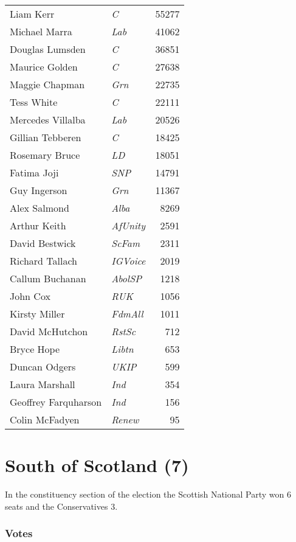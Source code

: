 {\footnotesize
\begin{tabular*}{\columnwidth}{@{\extracolsep{\fill}} p{} >{\itshape}l r @{\extracolsep{\fill}}}
	Liam Kerr & C & 55277\\%
	Michael Marra & Lab & 41062\\%
	Douglas Lumsden & C & 36851\\%
	Maurice Golden & C & 27638\\%
	Maggie Chapman & Grn & 22735\\%
	Tess White & C & 22111\\%
	Mercedes Villalba & Lab & 20526\\%
	\hline
	Gillian Tebberen & C & 18425\\
	Rosemary Bruce & LD & 18051\\
	Fatima Joji & SNP & 14791\\
	Guy Ingerson & Grn & 11367\\
	Alex Salmond & Alba & 8269\\
	Arthur Keith & AfUnity & 2591\\
	David Bestwick & ScFam & 2311\\
	Richard Tallach & IGVoice & 2019\\
	Callum Buchanan & AbolSP & 1218\\
	John Cox & RUK & 1056\\
	Kirsty Miller & FdmAll & 1011\\
	David McHutchon & RstSc & 712\\
	Bryce Hope & Libtn & 653\\
	Duncan Odgers & UKIP & 599\\
	Laura Marshall & Ind & 354\\
	Geoffrey Farquharson & Ind & 156\\
	Colin McFadyen & Renew & 95\\
\end{tabular*}
	
}


\section[South of Scotland]{South of Scotland (7)}

In the constituency section of the election the Scottish National Party won 6 seats and the Conservatives 3.

\subsubsection*{Votes}

